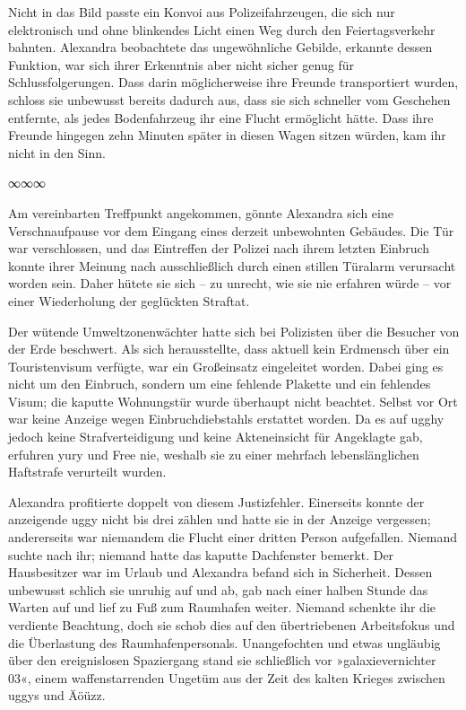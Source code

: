 Nicht in das Bild passte ein Konvoi aus Polizeifahrzeugen, die sich nur elektronisch und ohne blinkendes Licht einen Weg durch den Feiertagsverkehr bahnten. Alexandra beobachtete das ungewöhnliche Gebilde, erkannte dessen Funktion, war sich ihrer Erkenntnis aber nicht sicher genug für Schlussfolgerungen. Dass darin möglicherweise ihre Freunde transportiert wurden, schloss sie unbewusst bereits dadurch aus, dass sie sich schneller vom Geschehen entfernte, als jedes Bodenfahrzeug ihr eine Flucht ermöglicht hätte. Dass ihre Freunde hingegen zehn Minuten später in diesen Wagen sitzen würden, kam ihr nicht in den Sinn.

\begin{center}
∞∞∞
\end{center}

Am vereinbarten Treffpunkt angekommen, gönnte Alexandra sich eine Verschnaufpause vor dem Eingang eines derzeit unbewohnten Gebäudes. Die Tür war verschlossen, und das Eintreffen der Polizei nach ihrem letzten Einbruch konnte ihrer Meinung nach ausschließlich durch einen stillen Türalarm verursacht worden sein. Daher hütete sie sich – zu unrecht, wie sie nie erfahren würde – vor einer Wiederholung der geglückten Straftat.

Der wütende Umweltzonenwächter hatte sich bei Polizisten über die Besucher von der Erde beschwert. Als sich herausstellte, dass aktuell kein Erdmensch über ein Touristenvisum verfügte, war ein Großeinsatz eingeleitet worden. Dabei ging es nicht um den Einbruch, sondern um eine fehlende Plakette und ein fehlendes Visum; die kaputte Wohnungstür wurde überhaupt nicht beachtet. Selbst vor Ort war keine Anzeige wegen Einbruchdiebstahls erstattet worden. Da es auf ugghy jedoch keine Strafverteidigung und keine Akteneinsicht für Angeklagte gab, erfuhren yury und Free nie, weshalb sie zu einer mehrfach lebenslänglichen Haftstrafe verurteilt wurden.

Alexandra profitierte doppelt von diesem Justizfehler. Einerseits konnte der anzeigende uggy nicht bis drei zählen und hatte sie in der Anzeige vergessen; andererseits war niemandem die Flucht einer dritten Person aufgefallen. Niemand suchte nach ihr; niemand hatte das kaputte Dachfenster bemerkt. Der Hausbesitzer war im Urlaub und Alexandra befand sich in Sicherheit. Dessen unbewusst schlich sie unruhig auf und ab, gab nach einer halben Stunde das Warten auf und lief zu Fuß zum Raumhafen weiter. Niemand schenkte ihr die verdiente Beachtung, doch sie schob dies auf den übertriebenen Arbeitsfokus und die Überlastung des Raumhafenpersonals. Unangefochten und etwas ungläubig über den ereignislosen Spaziergang stand sie schließlich vor »galaxievernichter 03«, einem waffenstarrenden Ungetüm aus der Zeit des kalten Krieges zwischen uggys und Äöüzz.

